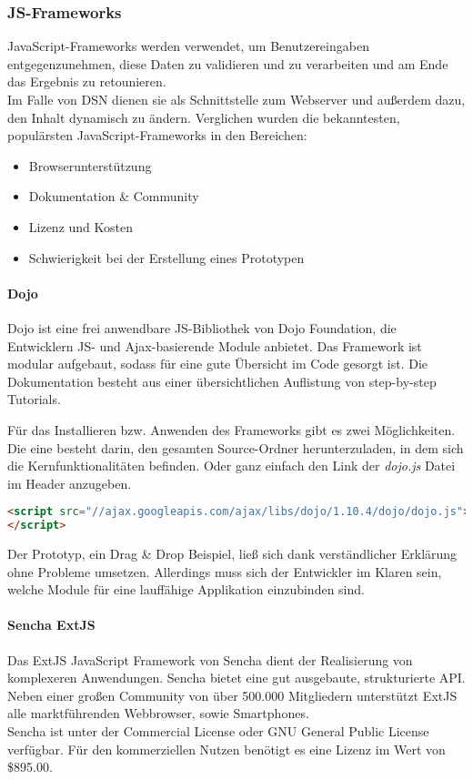 \subsubsection{JS-Frameworks}
JavaScript-Frameworks werden verwendet, um Benutzereingaben entgegenzunehmen, diese Daten zu validieren und zu verarbeiten und am Ende das Ergebnis zu retounieren.\\
Im Falle von DSN dienen sie als Schnittstelle zum Webserver und außerdem dazu, den Inhalt dynamisch zu ändern. Verglichen wurden die bekanntesten, populärsten JavaScript-Frameworks in den Bereichen:
\begin{itemize}
\item Browserunterstützung
\item Dokumentation \& Community
\item Lizenz und Kosten
\item Schwierigkeit bei der Erstellung eines Prototypen
\end{itemize}
\paragraph{Dojo}
Dojo ist eine frei anwendbare JS-Bibliothek von Dojo Foundation, die Entwicklern JS- und Ajax-basierende Module anbietet. Das Framework ist modular aufgebaut, sodass für eine gute Übersicht im Code gesorgt ist. Die Dokumentation besteht aus einer übersichtlichen Auflistung von step-by-step Tutorials. \cite{DOJO}

Für das Installieren bzw. Anwenden des Frameworks gibt es zwei Möglichkeiten. Die eine besteht darin, den gesamten Source-Ordner herunterzuladen, in dem sich die Kernfunktionalitäten befinden. Oder ganz einfach den Link der \textit{dojo.js} Datei im Header anzugeben.
\begin{lstlisting}[caption={Dojo einbinden\cite{DOJODOWN}}, language=HTML]
<script src="//ajax.googleapis.com/ajax/libs/dojo/1.10.4/dojo/dojo.js">
</script>
\end{lstlisting}

Der Prototyp, ein Drag \& Drop Beispiel, ließ sich dank verständlicher Erklärung ohne Probleme umsetzen. Allerdings muss sich der Entwickler im Klaren sein, welche Module für eine lauffähige Applikation einzubinden sind. \cite{DOJO}

\paragraph{Sencha ExtJS}
Das ExtJS JavaScript Framework von Sencha dient der Realisierung von komplexeren Anwendungen. Sencha bietet eine gut ausgebaute, strukturierte API. Neben einer großen Community von über 500.000 Mitgliedern unterstützt ExtJS alle marktführenden Webbrowser, sowie Smartphones.\\
Sencha ist unter der Commercial License oder GNU General Public License verfügbar. Für den kommerziellen Nutzen benötigt es eine Lizenz im Wert von \$895.00.\cite{SENCHA}

